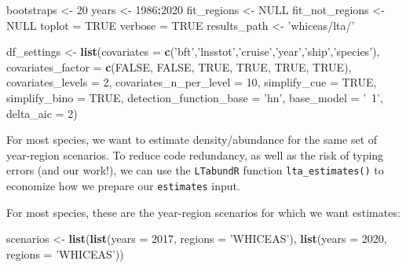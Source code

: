 \documentclass[
]{book}
\newenvironment{Shaded}{\begin{snugshade}}{\end{snugshade}}
\newcommand{\DataTypeTok}[1]{\textcolor[rgb]{0.13,0.29,0.53}{#1}}
\newcommand{\DecValTok}[1]{\textcolor[rgb]{0.00,0.00,0.81}{#1}}
\newcommand{\KeywordTok}[1]{\textcolor[rgb]{0.13,0.29,0.53}{\textbf{#1}}}
\newcommand{\NormalTok}[1]{#1}
\newcommand{\OperatorTok}[1]{\textcolor[rgb]{0.81,0.36,0.00}{\textbf{#1}}}
\newcommand{\OtherTok}[1]{\textcolor[rgb]{0.56,0.35,0.01}{#1}}
\newcommand{\StringTok}[1]{\textcolor[rgb]{0.31,0.60,0.02}{#1}}
\begin{document}
\begin{Shaded}
\begin{Highlighting}[]
\NormalTok{bootstraps <-}\StringTok{ }\DecValTok{20}
\NormalTok{years <-}\StringTok{ }\DecValTok{1986}\OperatorTok{:}\DecValTok{2020}
\NormalTok{fit_regions <-}\StringTok{ }\OtherTok{NULL}
\NormalTok{fit_not_regions <-}\StringTok{ }\OtherTok{NULL}
\NormalTok{toplot =}\StringTok{ }\OtherTok{TRUE}
\NormalTok{verbose =}\StringTok{ }\OtherTok{TRUE}
\NormalTok{results_path <-}\StringTok{ 'whiceas/lta/'}

\NormalTok{df_settings <-}
\StringTok{  }\KeywordTok{list}\NormalTok{(}\DataTypeTok{covariates =} \KeywordTok{c}\NormalTok{(}\StringTok{'bft'}\NormalTok{,}\StringTok{'lnsstot'}\NormalTok{,}\StringTok{'cruise'}\NormalTok{,}\StringTok{'year'}\NormalTok{,}\StringTok{'ship'}\NormalTok{,}\StringTok{'species'}\NormalTok{),}
       \DataTypeTok{covariates_factor =} \KeywordTok{c}\NormalTok{(}\OtherTok{FALSE}\NormalTok{, }\OtherTok{FALSE}\NormalTok{, }\OtherTok{TRUE}\NormalTok{, }\OtherTok{TRUE}\NormalTok{, }\OtherTok{TRUE}\NormalTok{, }\OtherTok{TRUE}\NormalTok{),}
       \DataTypeTok{covariates_levels =} \DecValTok{2}\NormalTok{,}
       \DataTypeTok{covariates_n_per_level =} \DecValTok{10}\NormalTok{,}
       \DataTypeTok{simplify_cue =} \OtherTok{TRUE}\NormalTok{,}
       \DataTypeTok{simplify_bino =} \OtherTok{TRUE}\NormalTok{,}
       \DataTypeTok{detection_function_base =} \StringTok{'hn'}\NormalTok{,}
       \DataTypeTok{base_model =} \StringTok{'~1'}\NormalTok{,}
       \DataTypeTok{delta_aic =} \DecValTok{2}\NormalTok{)}
\end{Highlighting}
\end{Shaded}

For most species, we want to estimate density/abundance for the same set of year-region scenarios. To reduce code redundancy, as well as the risk of typing errors (and our work!), we can use the \texttt{LTabundR} function \texttt{lta\_estimates()} to economize how we prepare our \texttt{estimates} input.

For most species, these are the year-region scenarios for which we want estimates:

\begin{Shaded}
\begin{Highlighting}[]
\NormalTok{scenarios <-}\StringTok{ }\KeywordTok{list}\NormalTok{(}\KeywordTok{list}\NormalTok{(}\DataTypeTok{years =} \DecValTok{2017}\NormalTok{,}
                       \DataTypeTok{regions =} \StringTok{'WHICEAS'}\NormalTok{),}
                  \KeywordTok{list}\NormalTok{(}\DataTypeTok{years =} \DecValTok{2020}\NormalTok{, }
                       \DataTypeTok{regions =} \StringTok{'WHICEAS'}\NormalTok{))}
\end{Highlighting}
\end{Shaded}
\end{document}
